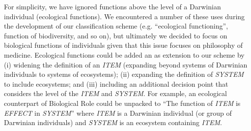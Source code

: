 \documentclass{article}
\begin{document}
For simplicity, we have ignored functions above the level of a Darwinian individual (ecological functions).
We encountered a number of these uses during the development of our classification scheme (e.g. ``ecological functioning'', function of biodiversity, and so on), but ultimately we decided to focus on biological functions of individuals given that this issue focuses on philosophy of medicine.
Ecological functions could be added an as extension to our scheme by (i) widening the definition of an \emph{ITEM} (expanding beyond systems of Darwinian individuals to systems of ecosystems); (ii) expanding the definition of \emph{SYSTEM} to include ecosystems; and (iii) including an additional decision point that considers the level of the \emph{ITEM} and \emph{SYSTEM}.
For example, an ecological counterpart of Biological Role could be unpacked to ``The function of \emph{ITEM} is \emph{EFFECT} in \emph{SYSTEM}'' where \emph{ITEM} is a Darwinian individual (or group of Darwinian individuals) and \emph{SYSTEM} is an ecosystem containing \emph{ITEM}.
\end{document}
